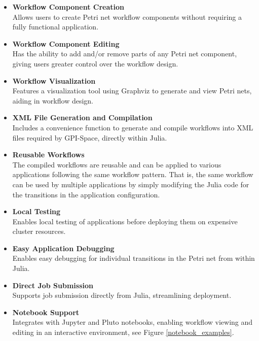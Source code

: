 \documentclass{juliacon}
\begin{document}
\begin{itemize}
    \item \textbf{Workflow Component Creation}\\
          Allows users to create Petri net workflow components without requiring a fully functional application.\vskip 6pt
    \item \textbf{Workflow Component Editing}\\
          Has the ability to add and/or remove parts of any Petri net component, giving users greater control over the workflow design.\vskip 6pt
    \item \textbf{Workflow Visualization}\\
          Features a visualization tool using Graphviz\cite{Graphviz81:online} to generate and view Petri nets, aiding in workflow design.\vskip 6pt
    \item \textbf{XML File Generation and Compilation}\\
           Includes a convenience function to generate and compile workflows into XML files required by GPI-Space, directly within Julia.\vskip 6pt
    \item \textbf{Reusable Workflows}\\
          The compiled workflows are reusable and can be applied to various applications following the same workflow pattern. 
          That is, the same workflow can be used by multiple applications by simply modifying the Julia code for the transitions in the application configuration.\vskip 6pt
    \item \textbf{Local Testing}\\
          Enables local testing of applications before deploying them on expensive cluster resources.\vskip 6pt
    \item \textbf{Easy Application Debugging}\\
          Enables easy debugging for individual transitions in the Petri net from within Julia.\vskip 6pt
    \item \textbf{Direct Job Submission}\\
          Supports job submission directly from Julia, streamlining deployment.\vskip 6pt
    \item \textbf{Notebook Support}\\
          Integrates with Jupyter\cite{Jupyter} and Pluto\cite{Plutojl} notebooks, enabling workflow viewing and editing in an interactive environment, see Figure \ref{notebook_examples}.\vskip 6pt
\end{itemize}
\end{document}
